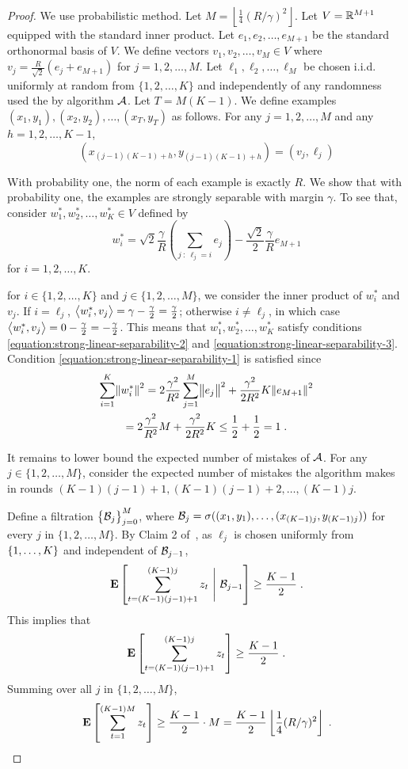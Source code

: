 \begin{proof}
We use probabilistic method. Let $M = \left\lfloor \frac{1}{4} (R/\gamma)^2
\right\rfloor$. Let $V = \mathbb{R}^{M+1}$ equipped with the standard inner product.
Let $e_1, e_2, \dots, e_{M+1}$ be the standard orthonormal basis of $V$. We
define vectors $v_1, v_2, \dots, v_M \in V$ where $v_j = \frac{R}{\sqrt{2}}(e_j
+ e_{M+1})$ for $j=1,2,\dots,M$. Let $\ell_1, \ell_2, \dots, \ell_M$ be chosen
i.i.d. uniformly at random from $\{1,2,\dots,K\}$ and independently of any
randomness used the by algorithm $\mathcal{A}$. Let $T = M (K - 1)$. We define examples $(x_1,
y_1), (x_2, y_2), \dots, (x_T, y_T)$ as follows. For any $j=1,2,\dots,M$ and any
$h=1,2,\dots,K-1$,
$$
(x_{(j-1)(K-1) + h}, y_{(j-1)(K-1) + h}) = (v_j, \ell_j)
$$


With probability one, the norm of each example is exactly $R$.
We show that with probability
one, the examples are strongly separable with margin $\gamma$. To see
that, consider $w_1^*, w_2^*, \dots, w_K^* \in V$ defined by
$$
w_i^* = \sqrt{2} \frac{\gamma}{R} \left( \sum_{j ~:~ \ell_j = i} e_j \right) - \frac{\sqrt{2}}2 \frac{\gamma}{R} e_{M+1}
$$
for $i=1,2,\dots,K$.

for $i \in \{1,2,\dots,K\}$ and $j \in
\{1,2,\dots,M\}$, we consider the inner product of $w_i^*$ and $v_j$.
If $i = \ell_j$, $\left\langle w_i^*, v_j \right\rangle = \gamma - \frac \gamma 2 = \frac \gamma 2$;
otherwise $i \neq \ell_j$, in which case 
$\left\langle w_i^*, v_j \right\rangle = 0 - \frac \gamma 2 = - \frac \gamma 2$.
This means that $w_1^*, w_2^*, \dots, w_K^*$ satisfy
conditions
\eqref{equation:strong-linear-separability-2} and
\eqref{equation:strong-linear-separability-3}. Condition \eqref{equation:strong-linear-separability-1}
is satisfied since
\begin{multline*}
\sum_{i=1}^K \norm{w_i^*}^2
= 2 \frac{\gamma^2}{R^2} \sum_{j=1}^M \norm{e_j}^2 +  \frac{\gamma^2}{2 R^2} K \norm{e_{M+1}}^2 \\
= 2 \frac{\gamma^2}{R^2} M + \frac{\gamma^2}{2 R^2} K
\le \frac{1}{2} + \frac{1}{2}
= 1 \; .
\end{multline*}

It remains to lower bound the expected number of mistakes of $\mathcal{A}$. For
any $j \in \{1,2,\dots,M\}$, consider the expected number of mistakes the
algorithm makes in rounds $(K-1)(j-1) + 1, (K-1)(j-1) + 2, \dots, (K-1)j$.

Define a filtration $\cbr{\calB_j}_{j=0}^M$,
where $\mathcal{B}_j = \sigma((x_1, y_1), \ldots, (x_{(K-1)j}, y_{(K-1)j}))$
for every $j$ in $\{1,2,\dots,M\}$.
By Claim 2 of~\citet{Daniely-Helbertal-2013}, as $\ell_j$
is chosen uniformly from $\cbr{1,\dots,K}$ and independent of $\mathcal{B}_{j-1}$,
$$
\Exp \sbr{ \sum_{t=(K-1)(j-1) + 1}^{(K-1)j} z_t ~\Bigg|~ \calB_{j-1} } \geq \frac{K-1}2 \; .
$$
This implies that
$$
\Exp \sbr{ \sum_{t=(K-1)(j-1) + 1}^{(K-1)j} z_t } \ge \frac{K-1}2 \; .
$$
Summing over all $j$ in $\{1,2,\dots,M\}$,
$$
\Exp \sbr{ \sum_{t=1}^{(K-1)M} z_t} \geq \frac{K-1}2 \cdot M = \frac{K-1}2 \left\lfloor \frac 1 4 (R/\gamma)^2 \right\rfloor \; .
$$


\end{proof}
